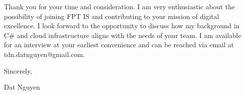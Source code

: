 \documentclass[letterpaper,11pt]{article}
\begin{document}
Thank you for your time and consideration. I am very enthusiastic about the possibility of joining FPT IS and contributing to your mission of digital excellence. I look forward to the opportunity to discuss how my background in C\# and cloud infrastructure aligns with the needs of your team. I am available for an interview at your earliest convenience and can be reached via email at tdn.datnguyen@gmail.com.

Sincerely,

\vspace{40pt}

Dat Nguyen
\end{document}
